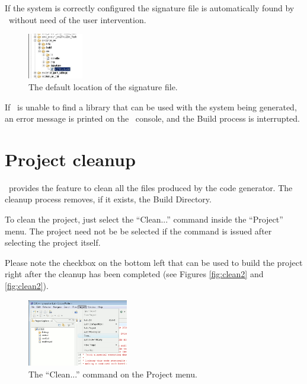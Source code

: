 If the system is correctly configured the signature file is
automatically found by \rtd\ without need of the user intervention.

\begin{figure}
  \begin{center}
    \includegraphics[width=2.4cm, bb=0 0 239 198]{images/sign4.png}
  \end{center}
  \caption{The default location of the signature file.}
  \label{fig:sign4}
\end{figure}

If \rtd\ is unable to find a library that can be used with the system
being generated, an error message is printed on the \rtd\ 
console, and the Build process is interrupted.


\section{Project cleanup}
\label{project-clean}

\rtd\  provides the feature to clean all the files produced by the code
generator. The cleanup process removes, if it
exists, the Build Directory.

To clean the project, just select the ``Clean...'' command inside the
``Project'' menu. The project need not be be selected if the command
is issued after selecting the project itself.

Please note the checkbox on the bottom left that can be used to build
the project right after the cleanup has been completed (see Figures
\ref{fig:clean2} and \ref{fig:clean2}).

\begin{figure}
  \begin{center}
    \includegraphics[width=4.4cm, bb=0 0 555 370]{images/clean1.png}
  \end{center}
  \caption{The ``Clean...'' command on the Project menu.}
  \label{fig:clean1}
\end{figure}

